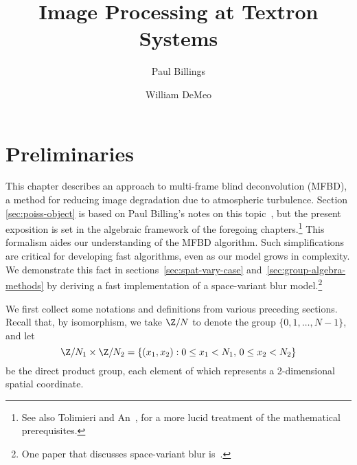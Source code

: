 


\title{Image Processing at Textron Systems}
\author{Paul Billings\and William DeMeo}
\maketitle

\section{Preliminaries}
This chapter describes an approach to multi-frame blind deconvolution
(MFBD), a method for reducing image degradation due to atmospheric
turbulence. Section \ref{sec:poiss-object} is based on Paul Billing's notes on
this topic~\cite{Billings:2001}, but the present exposition is set in 
the algebraic framework of the foregoing chapters.\footnote{See also Tolimieri and
An~\cite{Tolimieri:1998}, for a more lucid treatment of the mathematical prerequisites.} 
This formalism aides our understanding of the MFBD algorithm.  
Such simplifications %
are critical for developing fast algorithms, even as our model grows in complexity.  We
demonstrate this fact in sections~\ref{sec:spat-vary-case}
and~\ref{sec:group-algebra-methods} by deriving a fast
implementation of a space-variant blur 
model.\footnote{One paper that discusses space-variant blur is~\cite{Paxman:1994}.}

We first collect some notations and definitions from various preceding sections.  
Recall that, by isomorphism, we take $\Z/N$ to denote the group
$\{0,1,\ldots,N-1\}$, and let 
\[
\Z/N_1 \times \Z/N_2 = \{(x_1, x_2) : 0 \leq x_1 < N_1, \, 0 \leq x_2 < N_2 \}
\]
be the direct product group, each element of which represents a 2-dimensional
spatial coordinate. 


